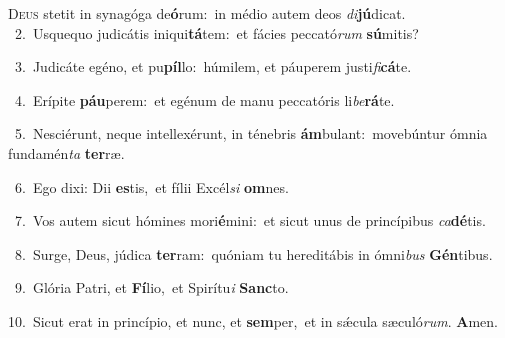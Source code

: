 \lettrine{\initial\textcolor{\initialcolor}{D}}{eus} stetit in synagóga de\-\textbf{ó}\-rum:~\star in médio autem deos \textit{di}\-\textbf{jú}dicat.\\
{\numbfont\textcolor{\numbcolor}{~2.}}~Usquequo judicátis iniqui\-\textbf{tá}\-tem:~\star et fácies peccató\textit{rum} \textbf{sú}\-mitis?\par
{\numbfont\textcolor{\numbcolor}{~3.}}~Judicáte egéno, et pu\-\textbf{píl}\-lo:~\star húmilem, et páuperem justi\-\textit{fi}\-\textbf{cá}te.\par
{\numbfont\textcolor{\numbcolor}{~4.}}~Erípite \textbf{páu}\-perem:~\star et egénum de manu peccatóris li\-\textit{be}\-\textbf{rá}te.\par
{\numbfont\textcolor{\numbcolor}{~5.}}~Nesciérunt, neque intellexérunt, in ténebris \textbf{ám}\-bulant:~\star movebúntur ómnia fundamén\textit{ta} \textbf{ter}\-ræ.\par
{\numbfont\textcolor{\numbcolor}{~6.}}~Ego dixi: Dii \textbf{es}\-tis,~\star et fílii Excél\textit{si} \textbf{om}\-nes.\par
{\numbfont\textcolor{\numbcolor}{~7.}}~Vos autem sicut hómines mori\-\textbf{é}\-mini:~\star et sicut unus de princípibus \textit{ca}\-\textbf{dé}tis.\par
{\numbfont\textcolor{\numbcolor}{~8.}}~Surge, Deus, júdica \textbf{ter}\-ram:~\star quóniam tu hereditábis in ómni\textit{bus} \textbf{Gén}\-tibus.\par
{\numbfont\textcolor{\numbcolor}{~9.}}~Glória Patri, et \textbf{Fí}\-lio,~\star et Spirítu\textit{i} \textbf{Sanc}\-to.\par
{\numbfont\textcolor{\numbcolor}{10.}}~Sicut erat in princípio, et nunc, et \textbf{sem}\-per,~\star et in sǽcula sæculó\-\textit{rum}\-. \textbf{A}\-men.\par
